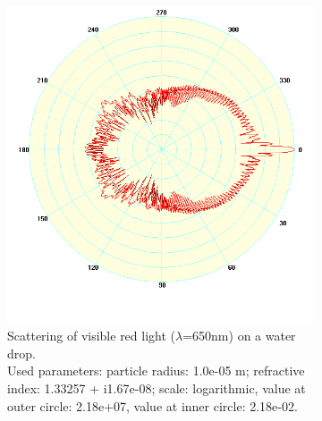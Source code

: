 \begin{figure}
    \centering
    \begin{subfigure}{0.45\textwidth}
        \includegraphics[width=\textwidth]{graphics/650nmonWaterEdited.png}
        \caption[Scattering on a Rain Drop]{Scattering of visible red light ($\lambda$=650nm) on a water drop.\\ Used parameters: particle radius: 1.0e-05 m; refractive index: 1.33257 + i1.67e-08; scale: logarithmic, value at outer circle: 2.18e+07, value at inner circle: 2.18e-02.\label{fig:red-on-raindrop}  }    
    \end{subfigure}
    \hspace{1cm}
    \begin{subfigure}{0.45\textwidth}

\end{subfigure}
\end{figure}
